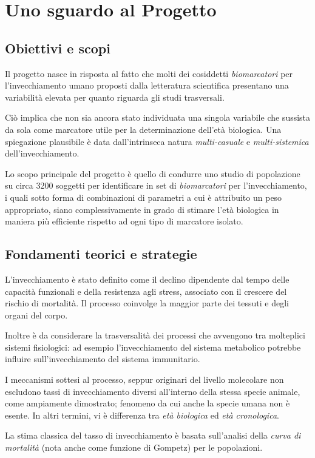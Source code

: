 \documentclass[a4paper]{report}
\begin{document}
\section{Uno sguardo al Progetto}
\subsection{Obiettivi e scopi}
Il progetto nasce in risposta al fatto che molti dei cosiddetti \textit{biomarcatori} per l'invecchiamento umano proposti dalla letteratura scientifica presentano una variabilità elevata per quanto riguarda gli studi trasversali.

Ciò implica che non sia ancora stato individuata una singola variabile che sussista da sola come marcatore utile per la determinazione dell'età biologica. Una spiegazione plausibile è data dall'intrinseca  natura \textit{multi-casuale} e \textit{multi-sistemica} dell'invecchiamento.

Lo scopo principale del progetto è quello di condurre uno studio di popolazione su circa 3200 soggetti per identificare in set di \textit{biomarcatori} per l'invecchiamento, i quali sotto forma di combinazioni di parametri a cui è attribuito un peso appropriato, siano complessivamente in grado di stimare l'età biologica in maniera più efficiente rispetto ad ogni tipo di marcatore isolato.

\subsection{Fondamenti teorici e strategie}
L'invecchiamento è stato definito come il declino dipendente dal tempo delle capacità funzionali e della resistenza agli stress, associato con il crescere del rischio di mortalità.
Il processo coinvolge la maggior parte dei tessuti e degli organi del corpo.

Inoltre è da considerare la trasversalità dei processi che avvengono tra molteplici sistemi fisiologici: ad esempio l'invecchiamento del sistema metabolico potrebbe influire sull'invecchiamento del sistema immunitario.

I meccanismi sottesi al processo, seppur originari del livello molecolare non escludono tassi di invecchiamento diversi all'interno della stessa specie animale, come ampiamente dimostrato; fenomeno da cui anche la specie umana non è esente. In altri termini, vi è differenza tra \textit{età biologica} ed \textit{età cronologica}.

La stima classica del tasso di invecchiamento è basata sull'analisi della \textit{curva di mortalità} (nota anche come funzione di Gompetz) per le popolazioni.
\end{document}
